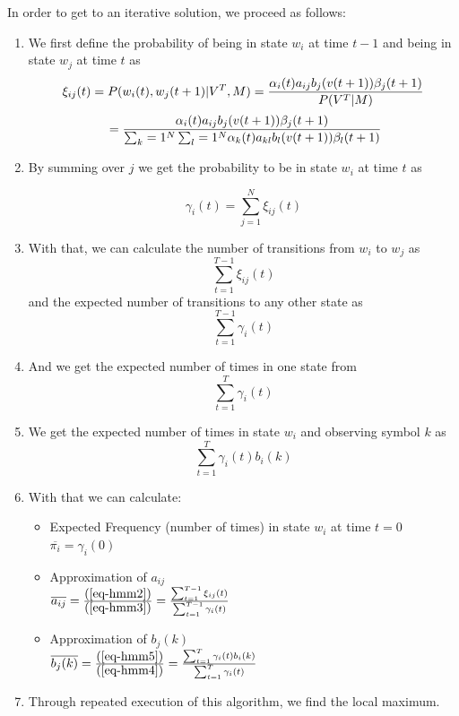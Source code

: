 \documentclass[a4paper, oneside]{csthesis}
\begin{document}
In order to get to an iterative solution, we proceed as follows:
\begin{enumerate}
\item We first define the probability of being in state $w_i$ at time $t-1$ and being in state $w_j$ at time $t$ as
$$
\xi_{ij} (t) = P(w_i(t), w_j(t+1)| V^T, M)
\\= \frac{\alpha_i(t)a_{ij}b_j(v(t+1))\beta_j(t+1)}{P(V^T|M)}
$$ $$\\= \frac{\alpha_i(t)a_{ij}b_j(v(t+1))\beta_j(t+1)}{\sum_k = 1^N \sum_l = 1^N \alpha_k(t)a_{kl}b_l(v(t+1))\beta_l(t+1)}
$$

\item By summing over $j$ we get the probability to be in state $w_i$ at time $t$ as

$$\gamma_i(t) = \sum\limits_{j=1}^N \xi_{ij}(t)$$



\item With that, we can calculate the number of transitions from $w_i$ to $w_j$ as
\begin{equation}
\sum\limits_{t=1}^{T-1} \xi_{ij}(t)
\label{eq-hmm2}
\end{equation}
and the expected number of transitions to any other state as
\begin{equation}
\sum\limits_{t=1}^{T-1} \gamma_{i}(t)
\label{eq-hmm3}
\end{equation}
\item And we get the expected number of times in one state from
\begin{equation}
\sum\limits_{t=1}^{T}\gamma_i(t)
\label{eq-hmm4}
\end{equation}

\item We get the expected number of times in state $w_i$ and observing symbol $k$ as
\begin{equation}
\sum_{t=1}^T \gamma_i(t)b_i(k)
\label{eq-hmm5}
\end{equation}


\item With that we can calculate:
\begin{itemize}
\item Expected Frequency (number of times) in state $w_i$ at time $t=0$ $\overline{\pi_i}= \gamma_i(0)$


\item Approximation of $a_{ij}$\\
$\overline{a_{ij}} = \frac{\mbox{(\ref{eq-hmm2})}}{\mbox{(\ref{eq-hmm3})}} = \frac{\sum_{t=1}^{T-1}\xi_{ij}(t)}{\sum_{t=1}^{T-1} \gamma_i(t)}$

\item Approximation of $b_{j}(k)$\\
$\overline{b_j(k)} = \frac{\mbox{(\ref{eq-hmm5})}}{\mbox{(\ref{eq-hmm4})}} = \frac{\sum_{t=1}^T \gamma_i(t)b_i(k)}{\sum_{t=1}^T \gamma_i(t)}$

\end{itemize}

\item Through repeated execution of this algorithm, we find the local maximum.

\end{enumerate}
\end{document}
